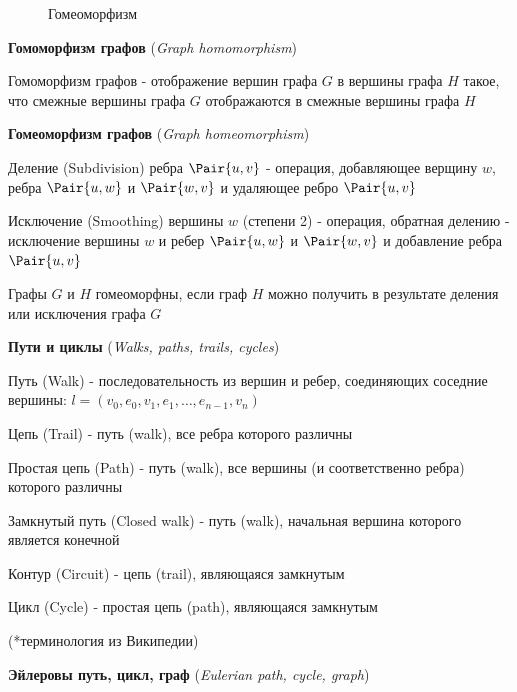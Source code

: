\documentclass[12pt]{article}
\begin{document}
\begin{enumerate}
\begin{minipage}{\linewidth}
\begin{figure}
\begin{center}
                    Гомеоморфизм
                \end{center}
            \end{figure}

            \smallvspace

            \item \textbf{Гомоморфизм графов} (\textit{Graph homomorphism})

            Гомоморфизм графов - отображение вершин графа $G$ в вершины графа $H$ такое,
            что смежные вершины графа $G$ отображаются в смежные вершины графа $H$


            \item \textbf{Гомеоморфизм графов} (\textit{Graph homeomorphism})

            Деление (Subdivision) ребра $\Pair{u, v}$ - операция, добавляющее верщину $w$, ребра $\Pair{u, w}$ и $\Pair{w, v}$ и удаляющее ребро $\Pair{u, v}$

            Исключение (Smoothing) вершины $w$ (степени 2) - операция, обратная делению - исключение вершины $w$ и ребер $\Pair{u, w}$ и $\Pair{w, v}$ и добавление ребра $\Pair{u, v}$

            Графы $G$ и $H$ гомеоморфны, если граф $H$ можно получить в результате деления или исключения графа $G$

        \end{minipage}

        \smallvspace

        \item \textbf{Пути и циклы} (\textit{Walks, paths, trails, cycles})

        Путь (Walk) - последовательность из вершин и ребер, соединяющих соседние вершины: $l = (v_0, e_0, v_1, e_1, \dots, e_{n - 1}, v_n)$

        Цепь (Trail) - путь (walk), все ребра которого различны

        Простая цепь (Path) - путь (walk), все вершины (и соответственно ребра) которого различны

        Замкнутый путь (Closed walk) - путь (walk), начальная вершина которого является конечной

        Контур (Circuit) - цепь (trail), являющаяся замкнутым

        Цикл (Cycle) - простая цепь (path), являющаяся замкнутым

        (*терминология из Википедии)


        \item \textbf{Эйлеровы путь, цикл, граф} (\textit{Eulerian path, cycle, graph})


\end{enumerate}
\end{document}
